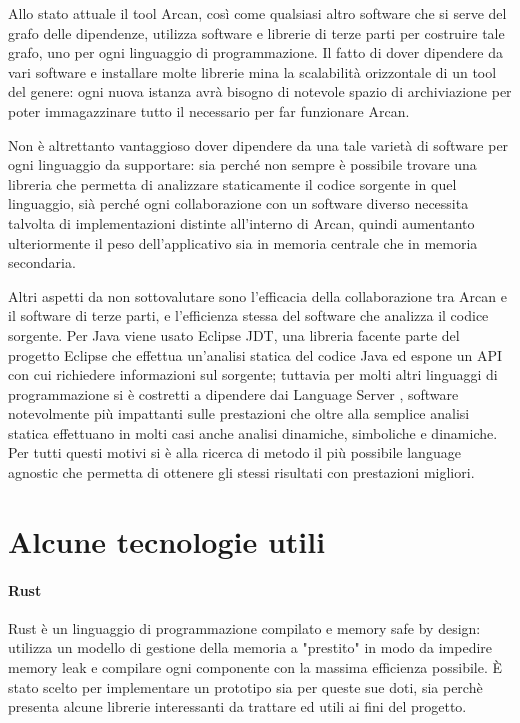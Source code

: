 Allo stato attuale il tool Arcan, cos\`i come qualsiasi altro software che si serve del grafo delle dipendenze, utilizza software e librerie di terze parti per costruire tale grafo, uno per ogni linguaggio di programmazione. Il fatto di dover dipendere da vari software e installare molte librerie mina la scalabilit\`a orizzontale di un tool del genere: ogni nuova istanza avr\`a bisogno di notevole spazio di archiviazione per poter immagazzinare tutto il necessario per far funzionare Arcan.

Non \`e altrettanto vantaggioso dover dipendere da una tale variet\`a di software per ogni linguaggio da supportare: sia perch\'e non sempre \`e possibile trovare una libreria che permetta di analizzare staticamente il codice sorgente in quel linguaggio, si\`a perch\'e ogni collaborazione con un software diverso necessita talvolta di implementazioni distinte all'interno di Arcan, quindi aumentanto ulteriormente il peso dell'applicativo sia in memoria centrale che in memoria secondaria.

Altri aspetti da non sottovalutare sono l'efficacia della collaborazione tra Arcan e il software di terze parti, e l'efficienza stessa del software che analizza il codice sorgente. Per Java viene usato Eclipse JDT, una libreria facente parte del progetto Eclipse che effettua un'analisi statica del codice Java ed espone un API con cui richiedere informazioni sul sorgente; tuttavia per molti altri linguaggi di programmazione si \`e costretti a dipendere dai Language Server \cite{LanguageServer}, software notevolmente pi\`u impattanti sulle prestazioni che oltre alla semplice analisi statica effettuano in molti casi anche analisi dinamiche, simboliche e dinamiche. Per tutti questi motivi si \`e alla ricerca di metodo il pi\`u possibile language agnostic che permetta di ottenere gli stessi risultati con prestazioni migliori.

\section{Alcune tecnologie utili}

\paragraph{Rust}
Rust \cite{blandy2017programming} \`e un linguaggio di programmazione compilato e memory safe by design: utilizza un modello di gestione della memoria a "prestito" in modo da impedire memory leak e compilare ogni componente con la massima efficienza possibile. \`E stato scelto per implementare un prototipo sia per queste sue doti, sia perch\`e presenta alcune librerie interessanti da trattare ed utili ai fini del progetto.


